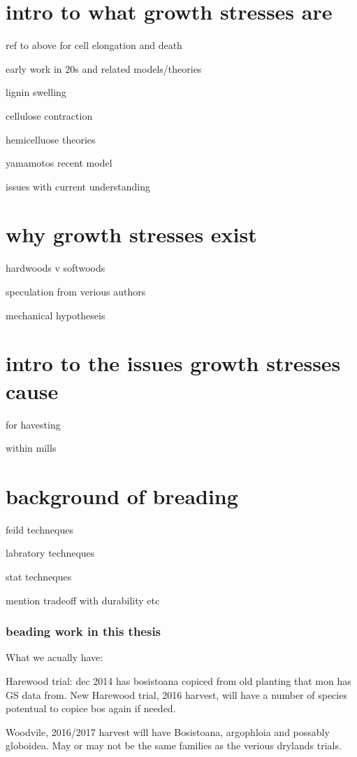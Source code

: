 \documentclass{article}
\begin{document}
\section{intro to what growth stresses are}

ref to above for cell elongation and death

early work in 20s and related models/theories

lignin swelling

cellulose contraction

hemicelluose theories

yamamotos recent model

issues with current understanding



\section{why growth stresses exist}

hardwoods v softwoods

speculation from verious authors

mechanical hypotheseis

\section{intro to the issues growth stresses cause }

for havesting

within mills

\section{background of breading}

feild techneques

labratory techneques

stat techneques

mention tradeoff with durability etc

\subsubsection{beading work in this thesis}
What we acually have:

Harewood trial:
dec 2014 has bosistoana copiced from old planting that mon has GS data from.
New Harewood trial, 2016 harvest, will have a number of species potentual to copice bos again if needed.

Woodvile, 2016/2017 harvest will have Bosistoana, argophloia and possably globoidea. May or may not be the same families as the verious drylands trials.
\end{document}
